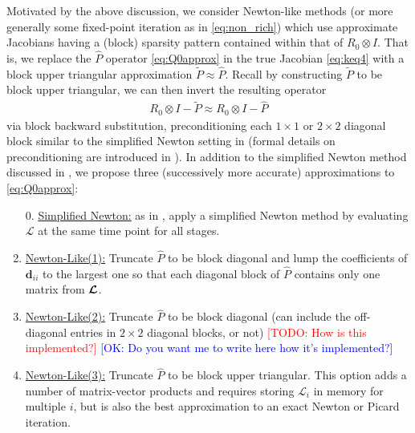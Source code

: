 \documentclass[review]{siamart}
\makeatletter
\newcommand{\todo}[1]{\textcolor{red}{[TODO\@: #1]}}
\newcommand{\OK}[1]{\textcolor{blue}{[OK: #1]}}
\makeatother
\begin{document}
Motivated by the above discussion, we consider Newton-like methods (or more
generally some fixed-point iteration as in \eqref{eq:non_rich}) which use
approximate Jacobians having a (block) sparsity pattern contained within that of
$R_0 \otimes I$. That is, we replace the $\widehat{P}$ operator
\eqref{eq:Q0approx} in the true Jacobian \eqref{eq:keq4} with a block upper
triangular approximation $\widetilde{P} \approx \widehat{P}$. Recall by
constructing $\widetilde{P}$ to be block upper triangular, we can then invert
the resulting operator
%
\begin{align}
R_0 \otimes I -  \widetilde{P} \approx R_0 \otimes I -\widehat{P}
\end{align}
%
via block backward substitution, preconditioning each $1\times 1$
or $2\times 2$ diagonal block similar to the simplified Newton setting in
 (formal details on preconditioning are introduced
in ). In addition to the simplified Newton
method discussed in , we propose three (successively
more accurate) approximations to \eqref{eq:Q0approx}:
\vspace{1ex}
%
\begin{enumerate}
\setlength\itemsep{0.5em}
\item[0.] \underline{Simplified Newton:} as in , apply a
simplified Newton method by evaluating $\mathcal{L}$ at the same time point for
all stages.

\item \underline{Newton-Like(1):} Truncate $\widehat{P}$ to be block diagonal and
lump the coefficients of $\bm{d}_{ii}$ to the largest one so that each diagonal
block of $\widehat{P}$ contains only one matrix from $\bm{{\cal L}}$.

\item \underline{Newton-Like(2):} Truncate $\widehat{P}$ to be block diagonal
(can include the off-diagonal entries in $2 \times 2$ diagonal blocks, or not)
\todo{How is this implemented?} \OK{Do you want me to write here how it's implemented?}

\item \underline{Newton-Like(3):} Truncate $\widehat{P}$ to be block upper triangular.
This option adds a number of matrix-vector products and requires storing $\mathcal{L}_i$
in memory for multiple $i$, but is also the best approximation to an exact Newton or
Picard iteration.

\end{enumerate}
\end{document}
